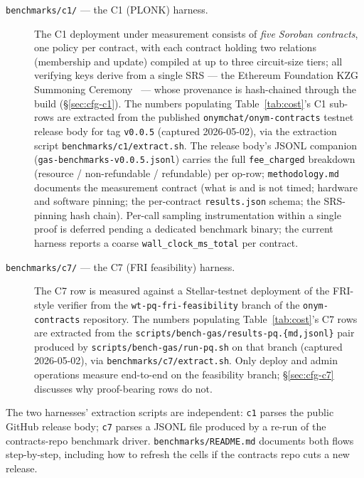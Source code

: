 \documentclass[conference]{IEEEtran}
\begin{document}
\begin{description}
  \item[\texttt{benchmarks/c1/} --- the C1 (PLONK) harness.] The C1
    deployment under measurement consists of \emph{five Soroban
    contracts}, one policy per contract, with each contract holding
    two relations (membership and update) compiled at up to three
    circuit-size tiers; all verifying keys derive from a single SRS
    --- the Ethereum Foundation KZG Summoning
    Ceremony~\cite{eth-kzg-ceremony} --- whose provenance is
    hash-chained through the build (\S\ref{sec:cfg-c1}). The numbers
    populating Table~\ref{tab:cost}'s C1 sub-rows are extracted from
    the published \texttt{onymchat/onym-contracts} testnet release
    body for tag \texttt{v0.0.5} (captured 2026-05-02), via the
    extraction script \texttt{benchmarks/c1/extract.sh}. The release
    body's JSONL companion (\texttt{gas-benchmarks-v0.0.5.jsonl})
    carries the full \texttt{fee\_charged} breakdown
    (resource / non-refundable / refundable) per op-row;
    \texttt{methodology.md} documents the measurement contract
    (what is and is not timed; hardware and software pinning; the
    per-contract \texttt{results.json} schema; the SRS-pinning hash
    chain). Per-call sampling instrumentation within a single proof
    is deferred pending a dedicated benchmark binary; the current
    harness reports a coarse \texttt{wall\_clock\_ms\_total} per
    contract.

  \item[\texttt{benchmarks/c7/} --- the C7 (FRI feasibility)
    harness.] The C7 row is measured against a Stellar-testnet
    deployment of the FRI-style verifier from the
    \texttt{wt-pq-fri-feasibility} branch of the
    \texttt{onym-contracts} repository. The numbers populating
    Table~\ref{tab:cost}'s C7 rows are extracted from the
    \texttt{scripts/bench-gas/results-pq.\{md,jsonl\}} pair produced
    by \texttt{scripts/bench-gas/run-pq.sh} on that branch (captured
    2026-05-02), via \texttt{benchmarks/c7/extract.sh}. Only deploy
    and admin operations measure end-to-end on the feasibility
    branch; \S\ref{sec:cfg-c7} discusses why proof-bearing rows do
    not.
\end{description}

The two harnesses' extraction scripts are independent: \texttt{c1}
parses the public GitHub release body; \texttt{c7} parses a JSONL
file produced by a re-run of the contracts-repo benchmark driver.
\texttt{benchmarks/README.md} documents both flows step-by-step,
including how to refresh the cells if the contracts repo cuts a new
release.
\end{document}
